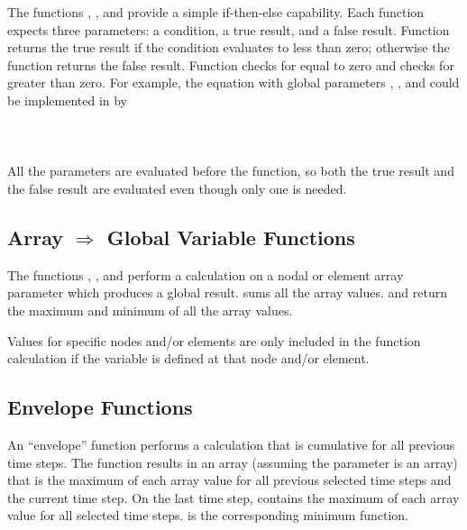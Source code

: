 The functions , , and  provide a simple
\mbox{if-then-else} capability. Each function expects three parameters:
a condition, a true result, and a false result. Function 
returns the true result if the condition evaluates to less than zero;
otherwise the function returns the false result. Function 
checks for equal to zero and  checks for greater than zero.
For example, the equation
\cenlinesbegin
{}
\cenlinesend
with global parameters , , and 
could be implemented in  by
\cenlinesbegin
{} \\
\hspace*{\myindent}  \\
 \\
\hspace*{\myindent}  \\
\cenlinesend
All the parameters are evaluated before the function, so both the true
result and the false result are evaluated even though only one is
needed.

\subsection*{Array $\Rightarrow$ Global Variable Functions}

The functions , , and  perform a
calculation on a nodal or element array parameter which produces a
global result.  sums all the array values.  and
 return the maximum and minimum of all the array values.

Values for specific nodes and/or elements are only included in the
function calculation if the variable is defined at that node and/or
element.

\subsection*{Envelope Functions}

An ``envelope'' function performs a calculation that is cumulative for
all previous time steps. The function  results in an array
(assuming the parameter is an array) that is the maximum of each array
value for all previous selected time steps and the current time step. On
the last time step,  contains the maximum of each array
value for all selected time steps.  is the corresponding
minimum function.
